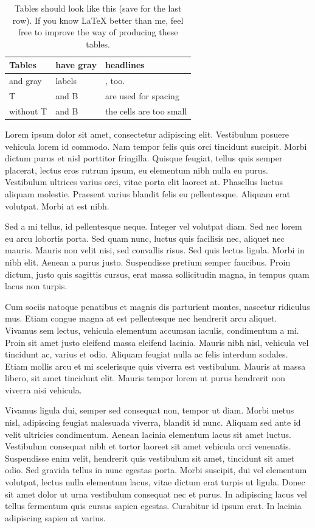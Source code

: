 \begin{table}[b]
\caption{Tables should look like this (save for the last row). If you know LaTeX better than me, feel free to improve the way of producing these tables.}
\begin{tabularx}{\linewidth}{|l|X|X|}
\hline
\rowcolor{slightgray}
\T Tables	&have gray  &headlines\\
\hline
\cellcolor{slightgray}\T and gray &labels \B&, too.\\
\hline
\cellcolor{slightgray}\T T &and B& are used for spacing\B\\
\hline
\cellcolor{slightgray} without T & and B& the cells are too small\B\\
\hline 
\end{tabularx}
\label{tab:example}
\end{table}

Lorem ipsum dolor sit amet, consectetur adipiscing elit. Vestibulum posuere vehicula lorem id commodo. Nam tempor felis quis orci tincidunt suscipit. Morbi dictum purus et nisl porttitor fringilla. Quisque feugiat, tellus quis semper placerat, lectus eros rutrum ipsum, eu elementum nibh nulla eu purus. Vestibulum ultrices varius orci, vitae porta elit laoreet at. Phasellus luctus aliquam molestie. Praesent varius blandit felis eu pellentesque. Aliquam erat volutpat. Morbi at est nibh.

Sed a mi tellus, id pellentesque neque. Integer vel volutpat diam. Sed nec lorem eu arcu lobortis porta. Sed quam nunc, luctus quis facilisis nec, aliquet nec mauris. Mauris non velit nisi, sed convallis risus. Sed quis lectus ligula. Morbi in nibh elit. Aenean a purus justo. Suspendisse pretium semper faucibus. Proin dictum, justo quis sagittis cursus, erat massa sollicitudin magna, in tempus quam lacus non turpis.

Cum sociis natoque penatibus et magnis dis parturient montes, nascetur ridiculus mus. Etiam congue magna at est pellentesque nec hendrerit arcu aliquet. Vivamus sem lectus, vehicula elementum accumsan iaculis, condimentum a mi. Proin sit amet justo eleifend massa eleifend lacinia. Mauris nibh nisl, vehicula vel tincidunt ac, varius et odio. Aliquam feugiat nulla ac felis interdum sodales. Etiam mollis arcu et mi scelerisque quis viverra est vestibulum. Mauris at massa libero, sit amet tincidunt elit. Mauris tempor lorem ut purus hendrerit non viverra nisi vehicula.

Vivamus ligula dui, semper sed consequat non, tempor ut diam. Morbi metus nisl, adipiscing feugiat malesuada viverra, blandit id nunc. Aliquam sed ante id velit ultricies condimentum. Aenean lacinia elementum lacus sit amet luctus. Vestibulum consequat nibh et tortor laoreet sit amet vehicula orci venenatis. Suspendisse enim velit, hendrerit quis vestibulum sit amet, tincidunt sit amet odio. Sed gravida tellus in nunc egestas porta. Morbi suscipit, dui vel elementum volutpat, lectus nulla elementum lacus, vitae dictum erat turpis ut ligula. Donec sit amet dolor ut urna vestibulum consequat nec et purus. In adipiscing lacus vel tellus fermentum quis cursus sapien egestas. Curabitur id ipsum erat. In lacinia adipiscing sapien at varius.

